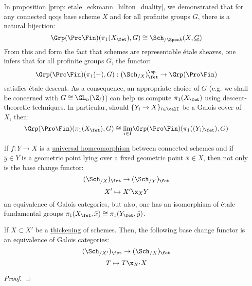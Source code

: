 \begin{remark} \label{remark: the_etale_fundamental_group_satisfies_descent}
            In proposition \ref{prop: etale_eckmann_hilton_duality}, we demonstrated that for any connected qcqs base scheme $X$ and for all profinite groups $G$, there is a natural bijection:
                $$\Grp(\Pro\Fin)(\pi_1(X_{\fet}), G) \cong \Sch_{/\Spec k}(X, \underline{G})$$
            From this and form the fact that schemes are representable \'etale sheaves, one infers that for all profinite groups $G$, the functor:
                $$\Grp(\Pro\Fin)(\pi_1(-), G): (\Sch_{/X})_{\fet}^{\op} \to \Grp(\Pro\Fin)$$
            satisfies \'etale descent. As a consequence, an appropriate choice of $G$ (e.g. we shall be concerned with $G \cong \GL_n(\Z_{\ell})$) can help us compute $\pi_1(X_{\fet})$ using descent-theoretic techniques. In particular, should $\{Y_i \to X\}_{i \in \calI}$ be a Galois cover of $X$, then:
                $$\Grp(\Pro\Fin)(\pi_1(X_{\fet}), G) \cong \underset{i \in I}{\lim} \Grp(\Pro\Fin)(\pi_1((Y_i)_{\fet}), G)$$
        \end{remark}
        
        If $f: Y \to X$ is a \href{https://stacks.math.columbia.edu/tag/04DC}{\underline{universal homeomorphism}} between connected schemes and if $\bar{y} \in Y$ is a geometric point lying over a fixed geometric point $\bar{x} \in X$, then not only is the base change functor:
                    $$(\Sch_{/X})_{\fet} \to (\Sch_{/Y})_{\fet}$$
                    $$X' \mapsto X' \x_X Y$$
                an equivalence of Galois categories, but also, one has an isomorphism of \'etale fundamental groups $\pi_1(X_{\fet}, \bar{x}) \cong \pi_1(Y_{\fet}, \bar{y})$. 
                
        \begin{lemma} \label{lemma: base_change_of_thickenings}
            If $X \subset X'$ be a \href{https://stacks.math.columbia.edu/tag/04EW}{\underline{thickening}} of schemes. Then, the following base change functor is an equivalence of Galois categories:
                $$(\Sch_{/X'})_{\fet} \to (\Sch_{/X})_{\fet}$$
                $$T \mapsto T \x_{X'} X$$
        \end{lemma}
            \begin{proof}
                
            \end{proof}
            
